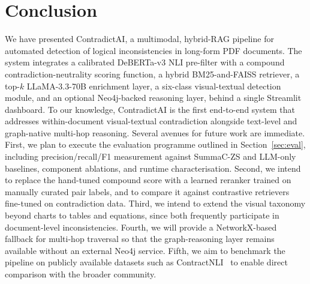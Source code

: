 \documentclass[conference]{IEEEtran}
\begin{document}
\section{Conclusion}\label{sec:conclusion}
We have presented ContradictAI, a multimodal, hybrid-RAG pipeline for automated detection of logical inconsistencies in long-form PDF documents. The system integrates a calibrated DeBERTa-v3 NLI pre-filter with a compound contradiction-neutrality scoring function, a hybrid BM25-and-FAISS retriever, a top-$k$ LLaMA-3.3-70B enrichment layer, a six-class visual-textual detection module, and an optional Neo4j-backed reasoning layer, behind a single Streamlit dashboard. To our knowledge, ContradictAI is the first end-to-end system that addresses within-document visual-textual contradiction alongside text-level and graph-native multi-hop reasoning.
Several avenues for future work are immediate. First, we plan to execute the evaluation programme outlined in Section~\ref{sec:eval}, including precision/recall/F1 measurement against SummaC-ZS and LLM-only baselines, component ablations, and runtime characterisation. Second, we intend to replace the hand-tuned compound score with a learned reranker trained on manually curated pair labels, and to compare it against contrastive retrievers fine-tuned on contradiction data. Third, we intend to extend the visual taxonomy beyond charts to tables and equations, since both frequently participate in document-level inconsistencies. Fourth, we will provide a NetworkX-based fallback for multi-hop traversal so that the graph-reasoning layer remains available without an external Neo4j service. Fifth, we aim to benchmark the pipeline on publicly available datasets such as ContractNLI~\cite{b13} to enable direct comparison with the broader community.
\end{document}
